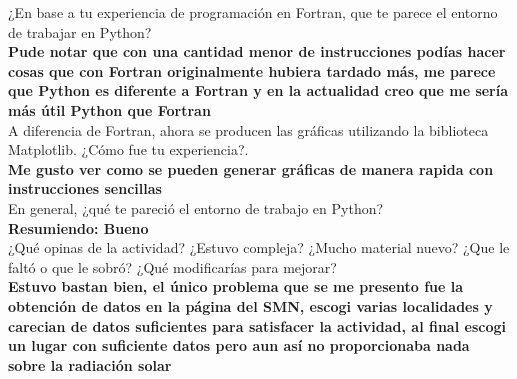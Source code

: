 \documentclass[notitlepage]{report}
\begin{document}
     ¿En base a tu experiencia de programación en Fortran, que te parece el entorno de trabajar en Python? \\ 
     {\bfseries Pude notar que con una cantidad menor de instrucciones podías hacer cosas que con Fortran originalmente hubiera tardado más, me parece que Python es diferente a Fortran y en la actualidad creo que me sería más útil Python que Fortran} \\
     
     A diferencia de Fortran, ahora se producen las gráficas utilizando la biblioteca Matplotlib. ¿Cómo fue tu experiencia?. \\
     {\bfseries Me gusto ver como se pueden generar gráficas de manera rapida con instrucciones sencillas } \\
     
     En general, ¿qué te pareció el entorno de trabajo en Python? \\
     {\bfseries Resumiendo: Bueno} \\
     
     ¿Qué opinas de la actividad? ¿Estuvo compleja? ¿Mucho material nuevo? ¿Que le faltó o que le sobró? ¿Qué modificarías para mejorar? \\
     {\bfseries Estuvo bastan bien, el único problema que se me presento fue la obtención de datos en la página del SMN, escogi varias localidades y carecian de datos suficientes para satisfacer la actividad, al final escogi un lugar con suficiente datos pero aun así no proporcionaba nada sobre la radiación solar}
     
     






      
      
\end{document}
